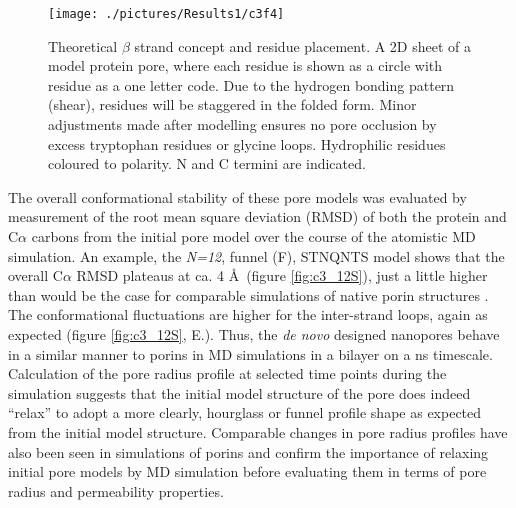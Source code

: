 \begin{figure}[H]
\begin{center}
\texttt{[image: ./pictures/Results1/c3f4]}
\caption[Theoretical $\beta$ strand concept and residue placement.] {Theoretical $\beta$ strand concept and residue placement. A 2D sheet of a model protein pore, where each residue is shown as a circle with residue as a one letter code. Due to the hydrogen bonding pattern (shear), residues will be staggered in the folded form. Minor adjustments made after modelling ensures no pore occlusion by excess tryptophan residues or glycine loops. Hydrophilic residues coloured to polarity. N and C termini are indicated.}
\label{fig:c3f4}
\end{center}
\end{figure}


The overall conformational stability of these pore models was evaluated by measurement of the root mean square deviation (RMSD) of both the protein and C$\alpha$ carbons from the initial pore model over the course of the atomistic MD simulation. An example, the \textit{N=12}, funnel (F), STNQNTS model shows that the overall C$\alpha$ RMSD  plateaus at ca. 4 \AA\ (figure \ref{fig:c3_12S}), just a little higher than would be the case for comparable simulations of native porin structures \cite{Watanabe1997,Soares1995}. The conformational fluctuations are higher for the inter-strand loops, again as expected (figure \ref{fig:c3_12S}, E.). Thus, the \textit{de novo} designed nanopores behave in a similar manner to porins in MD simulations in a bilayer on a  ns timescale. Calculation of the pore radius profile at selected time points during the simulation suggests that the initial model structure of the pore does indeed ``relax'' to adopt a more clearly, hourglass or funnel profile shape as expected from the initial model structure. Comparable changes in pore radius profiles have also been seen in simulations of porins \cite{Khalid2006,Kumar2010} and confirm the importance of relaxing initial pore models by MD simulation before evaluating them in terms of pore radius and permeability properties. 

